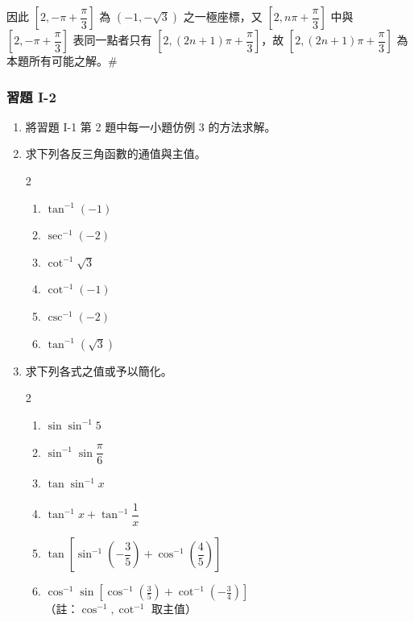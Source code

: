 因此 $\left[2, -\pi + \dfrac{\pi}{3}\right]$ 為 $(-1, -\sqrt{3})$ 之一極座標，又 $\left[2, n\pi + \dfrac{\pi}{3}\right]$ 中與 $\left[2, -\pi + \dfrac{\pi}{3}\right]$ 表同一點者只有 $\left[2, (2n+1)\pi + \dfrac{\pi}{3}\right]$，故 $\left[2, (2n+1)\pi + \dfrac{\pi}{3}\right]$ 為本題所有可能之解。\hfill $\#$

\subsubsection*{習題 I-2}\label{sec:b5-ex1-2}

\begin{enumerate}[label=\arabic*., topsep=4pt, itemsep=6pt]
  \item 將習題 I-1 第 2 題中每一小題仿例 3 的方法求解。

  \item 求下列各反三角函數的通值與主值。
  \begin{multicols}{2}
  \begin{enumerate}[label=(\alph*), topsep=2pt, itemsep=4pt]
    \item $\tan^{-1}(-1)$
    \item $\sec^{-1}(-2)$
    \item $\cot^{-1}\sqrt{3}$
    \item $\cot^{-1}(-1)$
    \item $\csc^{-1}(-2)$
    \item $\tan^{-1}(\sqrt{3})$
  \end{enumerate}
  \end{multicols}

  \item 求下列各式之值或予以簡化。
  \begin{multicols}{2}
  \begin{enumerate}[label=(\alph*), topsep=2pt, itemsep=4pt]
    \item $\sin \sin^{-1} 5$
    \item $\sin^{-1} \sin \dfrac{\pi}{6}$
    \item $\tan \sin^{-1} x$
    \item $\tan^{-1} x + \tan^{-1} \dfrac{1}{x}$
    \item $\tan\left[\sin^{-1}\left(-\dfrac{3}{5}\right) + \cos^{-1}\left(\dfrac{4}{5}\right)\right]$
    \item $\cos^{-1} \sin\left[\cos^{-1}\left(\tfrac{3}{5}\right) + \cot^{-1}\left(-\tfrac{3}{4}\right)\right]$ \\
    {\small（註：$\cos^{-1}, \cot^{-1}$ 取主值）}
  \end{enumerate}
  \end{multicols}


\end{enumerate}
